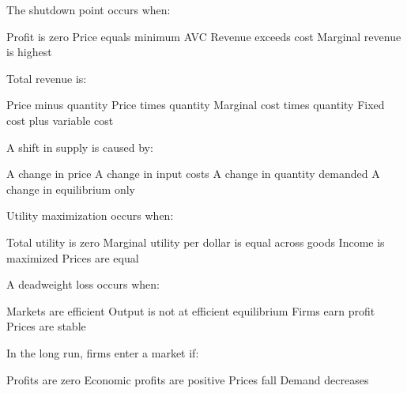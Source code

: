 \documentclass[12pt]{exam}
\begin{document}
\begin{questions}
    \begin{mcquestion}[2]
        The shutdown point occurs when:
        \begin{choices}
            \choice Profit is zero
            \CorrectChoice Price equals minimum AVC
            \choice Revenue exceeds cost
            \choice Marginal revenue is highest
        \end{choices}
    \end{mcquestion}

    \begin{mcquestion}[2]
        Total revenue is:
        \begin{choices}
            \choice Price minus quantity
            \CorrectChoice Price times quantity
            \choice Marginal cost times quantity
            \choice Fixed cost plus variable cost
        \end{choices}
    \end{mcquestion}

    \begin{mcquestion}[2]
        A shift in supply is caused by:
        \begin{choices}
            \choice A change in price
            \CorrectChoice A change in input costs
            \choice A change in quantity demanded
            \choice A change in equilibrium only
        \end{choices}
    \end{mcquestion}

    \begin{mcquestion}[2]
        Utility maximization occurs when:
        \begin{choices}
            \choice Total utility is zero
            \CorrectChoice Marginal utility per dollar is equal across goods
            \choice Income is maximized
            \choice Prices are equal
        \end{choices}
    \end{mcquestion}

    \begin{mcquestion}[2]
        A deadweight loss occurs when:
        \begin{choices}
            \choice Markets are efficient
            \CorrectChoice Output is not at efficient equilibrium
            \choice Firms earn profit
            \choice Prices are stable
        \end{choices}
    \end{mcquestion}

    \begin{mcquestion}[2]
        In the long run, firms enter a market if:
        \begin{choices}
            \choice Profits are zero
            \CorrectChoice Economic profits are positive
            \choice Prices fall
            \choice Demand decreases
        \end{choices}
    \end{mcquestion}


\end{questions}
\end{document}
